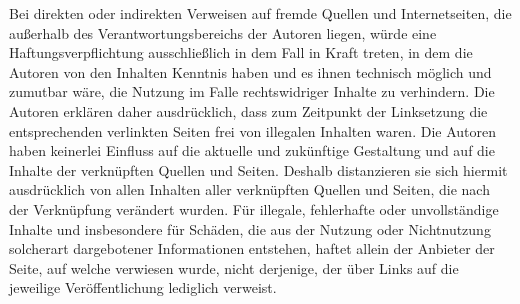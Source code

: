 Bei direkten oder indirekten Verweisen auf fremde Quellen und Internetseiten, die außerhalb des Verantwortungsbereichs der Autoren liegen, würde eine Haftungsverpflichtung ausschließlich in dem Fall in Kraft treten, in dem die Autoren von den Inhalten Kenntnis haben und es ihnen technisch möglich und zumutbar wäre, die Nutzung im Falle rechtswidriger Inhalte zu verhindern. Die Autoren erklären daher ausdrücklich, dass zum Zeitpunkt der Linksetzung die entsprechenden verlinkten Seiten frei von illegalen Inhalten waren. Die Autoren haben keinerlei Einfluss auf die aktuelle und zukünftige Gestaltung und auf die Inhalte der verknüpften Quellen und Seiten. Deshalb distanzieren sie sich hiermit ausdrücklich von allen Inhalten aller verknüpften Quellen und Seiten, die nach der Verknüpfung verändert wurden. Für illegale, fehlerhafte oder unvollständige Inhalte und insbesondere für Schäden, die aus der Nutzung oder Nichtnutzung solcherart dargebotener Informationen entstehen, haftet allein der Anbieter der Seite, auf welche verwiesen wurde, nicht derjenige, der über Links auf die jeweilige Veröffentlichung lediglich verweist.